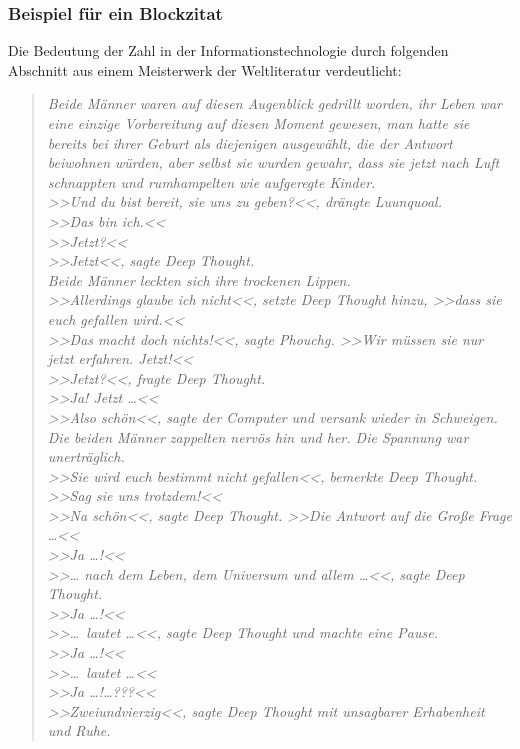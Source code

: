 \subsubsection{Beispiel für ein Blockzitat}
Die Bedeutung der Zahl  in der Informationstechnologie durch folgenden Abschnitt aus einem Meisterwerk der Weltliteratur verdeutlicht:
\begin{quote}
	\textit{Beide Männer waren auf diesen Augenblick gedrillt worden, 
			ihr Leben war eine einzige Vorbereitung auf diesen Moment gewesen, 
			man hatte sie bereits bei ihrer Geburt als diejenigen ausgewählt, 
			die der Antwort beiwohnen würden, aber selbst sie wurden gewahr, dass sie jetzt nach Luft schnappten und rumhampelten wie aufgeregte Kinder.\\
			>>Und du bist bereit, sie uns zu geben?<<, drängte Luunquoal.\\
			>>Das bin ich.<<\\
			>>Jetzt?<<\\
			>>Jetzt<<, sagte Deep Thought.\\
			Beide Männer leckten sich ihre trockenen Lippen.\\
			>>Allerdings glaube ich nicht<<, setzte Deep Thought hinzu, >>dass sie euch gefallen wird.<<\\
			>>Das macht doch nichts!<<, sagte Phouchg. >>Wir müssen sie nur jetzt erfahren. Jetzt!<<\\
			>>Jetzt?<<, fragte Deep Thought.\\
			>>Ja! Jetzt …<<\\
			>>Also schön<<, sagte der Computer und versank wieder in Schweigen. Die beiden Männer zappelten nervös hin und her. Die Spannung war unerträglich.\\
			>>Sie wird euch bestimmt nicht gefallen<<, bemerkte Deep Thought.\\
			>>Sag sie uns trotzdem!<<\\
			>>Na schön<<, sagte Deep Thought. >>Die Antwort auf die Große Frage \dots<<\\
			>>Ja \dots !<<\\
			>>… nach dem Leben, dem Universum und allem \dots<<, sagte Deep Thought.\\
			>>Ja \dots !<<\\
			>>\dots ~lautet \dots <<, sagte Deep Thought und machte eine Pause.\\
			>>Ja \dots !<<\\
			>>\dots ~lautet \dots <<\\
			>>Ja \dots !\dots ???<<\\
			>>Zweiundvierzig<<, sagte Deep Thought mit unsagbarer Erhabenheit und Ruhe.} \cite[Seiten 186 ff]{Douglas2013}
\end{quote}
